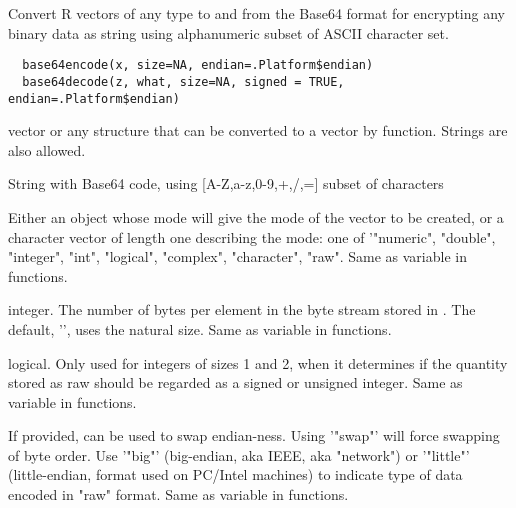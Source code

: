 \begin{Description}\relax
Convert R vectors of any type to and from the Base64 format for encrypting
any binary data as string using alphanumeric subset of ASCII character set.
\end{Description}
\begin{Usage}
\begin{verbatim}
  base64encode(x, size=NA, endian=.Platform$endian)
  base64decode(z, what, size=NA, signed = TRUE, endian=.Platform$endian)
\end{verbatim}
\end{Usage}
\begin{Arguments}
\begin{ldescription}
\item[\code{x}] vector or any structure that can be converted to a vector by  
 function. Strings are also allowed.
\item[\code{z}] String with Base64 code, using [A-Z,a-z,0-9,+,/,=] subset of 
characters
\item[\code{what}] Either an object whose mode will give the mode of the vector
to be created, or a character vector of length one describing
the mode: one of '"numeric", "double", "integer", "int",
"logical", "complex", "character", "raw".  
Same as variable  in  functions. 
\item[\code{size}] integer.  The number of bytes per element in the byte stream 
stored in . The default, '', uses the natural size. 
Same as variable  in  functions. 
\item[\code{signed}] logical. Only used for integers of sizes 1 and 2, when it
determines if the quantity stored as raw should be regarded as a
signed or unsigned integer.
Same as variable  in  functions. 
\item[\code{endian}] If provided, can be used to swap endian-ness. Using '"swap"' 
will force swapping of byte order. Use '"big"' (big-endian, aka IEEE, 
aka "network") or '"little"' (little-endian, format used on PC/Intel 
machines) to indicate type of data encoded in "raw" format.
Same as variable  in  functions.
\end{ldescription}
\end{Arguments}
